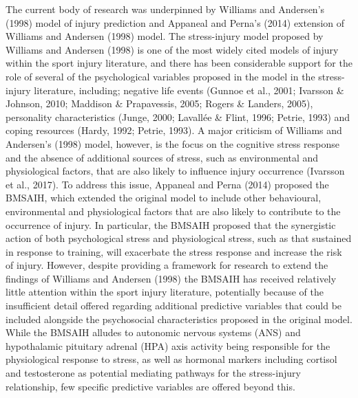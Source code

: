 \documentclass[man,floatsintext]{apa6}
\begin{document}
The current body of research was underpinned by Williams and Andersen's (1998) model of injury prediction and Appaneal and Perna's (2014) extension of Williams and Andersen (1998) model.
The stress-injury model proposed by Williams and Andersen (1998) is one of the most widely cited models of injury within the sport injury literature, and there has been considerable support for the role of several of the psychological variables proposed in the model in the stress-injury literature, including; negative life events (Gunnoe et al., 2001; Ivarsson \& Johnson, 2010; Maddison \& Prapavessis, 2005; Rogers \& Landers, 2005),
personality characteristics (Junge, 2000; Lavallée \& Flint, 1996; Petrie, 1993) and
coping resources (Hardy, 1992; Petrie, 1993).
A major criticism of Williams and Andersen's (1998) model, however, is the focus on the cognitive stress response and the absence of additional sources of stress, such as environmental and physiological factors, that are also likely to influence injury occurrence (Ivarsson et al., 2017).
To address this issue, Appaneal and Perna (2014) proposed the BMSAIH, which extended the original model to include other behavioural, environmental and physiological factors that are also likely to contribute to the occurrence of injury.
In particular, the BMSAIH proposed that the synergistic action of both psychological stress and physiological stress, such as that sustained in response to training, will exacerbate the stress response and increase the risk of injury.
However, despite providing a framework for research to extend the findings of Williams and Andersen (1998) the BMSAIH has received relatively little attention within the sport injury literature, potentially because of the insufficient detail offered regarding additional predictive variables that could be included alongside the psychosocial characteristics proposed in the original model.
While the BMSAIH alludes to autonomic nervous systems (ANS) and hypothalamic pituitary adrenal (HPA) axis activity being responsible for the physiological response to stress, as well as hormonal markers including cortisol and testosterone as potential mediating pathways for the stress-injury relationship, few specific predictive variables are offered beyond this.
\end{document}
